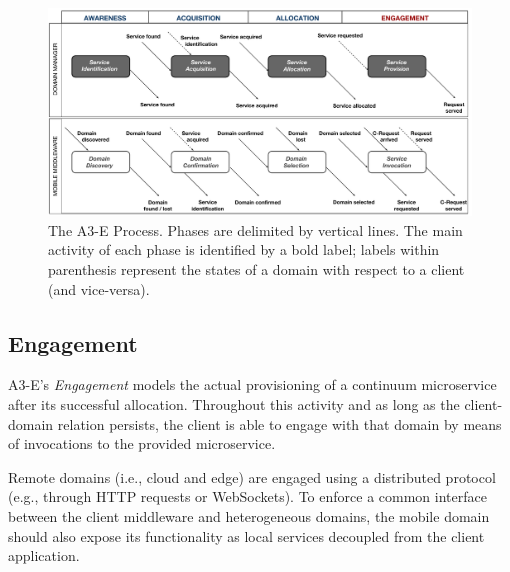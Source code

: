 \begin{figure}[tbp]
	\includegraphics[width=1\textwidth]{figs/A3-E-process}
	\caption{The A3-E Process. Phases are delimited by vertical lines. The main activity of each phase is identified by a bold label; labels within parenthesis represent the states of a domain with respect to a client (and vice-versa).}
	\label{fig:A3-E-process}
\end{figure}



\subsection{Engagement}\label{sec:A3-E-engagement}

A3-E's \textit{Engagement} models the actual provisioning of a continuum microservice after its successful allocation.
Throughout this activity and as long as the client-domain relation persists, the client is able to engage with that domain by means of invocations to the provided microservice. 

Remote domains (i.e., cloud and edge) are engaged using a distributed protocol (e.g., through HTTP requests or WebSockets). To enforce a common interface between the client middleware and heterogeneous domains, the mobile domain should also expose its functionality as local services decoupled from the client application.


